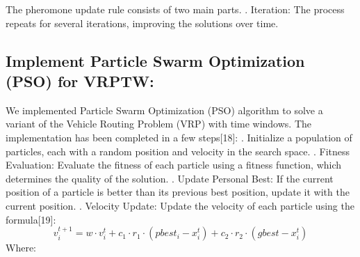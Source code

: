 The pheromone update rule consists of two main parts.
. Iteration: The process repeats for several iterations, improving the solutions over time.
\subsection{Implement Particle Swarm Optimization (PSO) for VRPTW:}
We implemented Particle Swarm Optimization (PSO) algorithm to solve a variant of the Vehicle Routing Problem (VRP) with time windows.
The implementation has been completed in a few steps[18]:
. Initialize a population of particles, each with a random position and velocity in the search space. 
. Fitness Evaluation: Evaluate the fitness of each particle using a fitness function, which determines the quality of the solution.
. Update Personal Best: If the current position of a particle is better than its previous best position, update it with the current position.
. Velocity Update: Update the velocity of each particle using the formula[19]:
\newline
\begin{equation}
v_i^{t+1} = w \cdot v_i^t + c_1 \cdot r_1 \cdot (pbest_i - x_i^t) + c_2 \cdot r_2 \cdot (gbest - x_i^t)
\end{equation}
Where:

